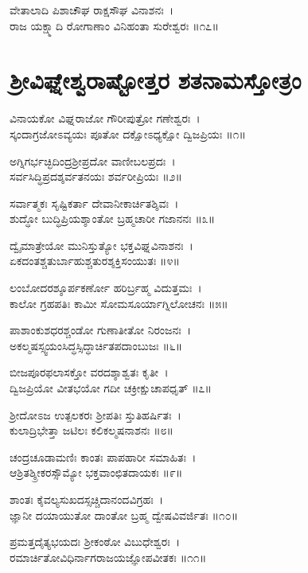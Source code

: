 ವೇತಾಲಾದಿ ಪಿಶಾಚೌಘ ರಾಕ್ಷಸೌಘ ವಿನಾಶನಃ~।\\
ರಾಜ ಯಕ್ಷ್ಮಾದಿ ರೋಗಾಣಾಂ ವಿನಿಹಂತಾ ಸುರೇಶ್ವರಃ ॥೧೭॥
\section{ಶ್ರೀವಿಘ್ನೇಶ್ವರಾಷ್ಟೋತ್ತರ ಶತನಾಮಸ್ತೋತ್ರಂ}
  
ವಿನಾಯಕೋ ವಿಘ್ನರಾಜೋ ಗೌರೀಪುತ್ರೋ ಗಣೇಶ್ವರಃ~।\\
ಸ್ಕಂದಾಗ್ರಜೋಽವ್ಯಯಃ ಪೂತೋ ದಕ್ಷೋಽಧ್ಯಕ್ಷೋ ದ್ವಿಜಪ್ರಿಯಃ ॥೧॥

ಅಗ್ನಿಗರ್ಭಚ್ಛಿದಿಂದ್ರಶ್ರೀಪ್ರದೋ ವಾಣೀಬಲಪ್ರದಃ~।\\
ಸರ್ವಸಿದ್ಧಿಪ್ರದಶ್ಶರ್ವತನಯಃ ಶರ್ವರೀಪ್ರಿಯಃ ॥೨॥

ಸರ್ವಾತ್ಮಕಃ ಸೃಷ್ಟಿಕರ್ತಾ ದೇವಾನೀಕಾರ್ಚಿತಶ್ಶಿವಃ~।\\
ಶುದ್ಧೋ ಬುದ್ಧಿಪ್ರಿಯಶ್ಶಾಂತೋ ಬ್ರಹ್ಮಚಾರೀ ಗಜಾನನಃ ॥೩॥

ದ್ವೈಮಾತ್ರೇಯೋ ಮುನಿಸ್ತುತ್ಯೋ ಭಕ್ತವಿಘ್ನವಿನಾಶನಃ~।\\
ಏಕದಂತಶ್ಚತುರ್ಬಾಹುಶ್ಚತುರಶ್ಶಕ್ತಿಸಂಯುತಃ ॥೪॥

ಲಂಬೋದರಶ್ಶೂರ್ಪಕರ್ಣೋ ಹರಿರ್ಬ್ರಹ್ಮ ವಿದುತ್ತಮಃ~।\\
ಕಾಲೋ ಗ್ರಹಪತಿಃ ಕಾಮೀ ಸೋಮಸೂರ್ಯಾಗ್ನಿಲೋಚನಃ ॥೫॥

ಪಾಶಾಂಕುಶಧರಶ್ಚಂಡೋ ಗುಣಾತೀತೋ ನಿರಂಜನಃ~।\\
ಅಕಲ್ಮಷಸ್ಸ್ವಯಂಸಿದ್ಧಸ್ಸಿದ್ಧಾರ್ಚಿತಪದಾಂಬುಜಃ ॥೬॥

ಬೀಜಪೂರಫಲಾಸಕ್ತೋ ವರದಶ್ಶಾಶ್ವತಃ ಕೃತೀ~।\\
ದ್ವಿಜಪ್ರಿಯೋ ವೀತಭಯೋ ಗದೀ ಚಕ್ರೀಕ್ಷುಚಾಪಧೃತ್ ॥೭॥

ಶ್ರೀದೋಽಜ ಉತ್ಪಲಕರಃ ಶ್ರೀಪತಿಃ ಸ್ತುತಿಹರ್ಷಿತಃ~।\\
ಕುಲಾದ್ರಿಭೇತ್ತಾ ಜಟಿಲಃ ಕಲಿಕಲ್ಮಷನಾಶನಃ ॥೮॥

ಚಂದ್ರಚೂಡಾಮಣಿಃ ಕಾಂತಃ ಪಾಪಹಾರೀ ಸಮಾಹಿತಃ~।\\
ಆಶ್ರಿತಶ್ಶ್ರೀಕರಸ್ಸೌಮ್ಯೋ ಭಕ್ತವಾಂಛಿತದಾಯಕಃ ॥೯॥

ಶಾಂತಃ ಕೈವಲ್ಯಸುಖದಸ್ಸಚ್ಚಿದಾನಂದವಿಗ್ರಹಃ~।\\
ಜ್ಞಾನೀ ದಯಾಯುತೋ ದಾಂತೋ ಬ್ರಹ್ಮ ದ್ವೇಷವಿವರ್ಜಿತಃ ॥೧೦॥

ಪ್ರಮತ್ತದೈತ್ಯಭಯದಃ ಶ್ರೀಕಂಠೋ ವಿಬುಧೇಶ್ವರಃ~।\\
ರಮಾರ್ಚಿತೋವಿಧಿರ್ನಾಗರಾಜಯಜ್ಞೋಪವೀತಕಃ ॥೧೧॥

